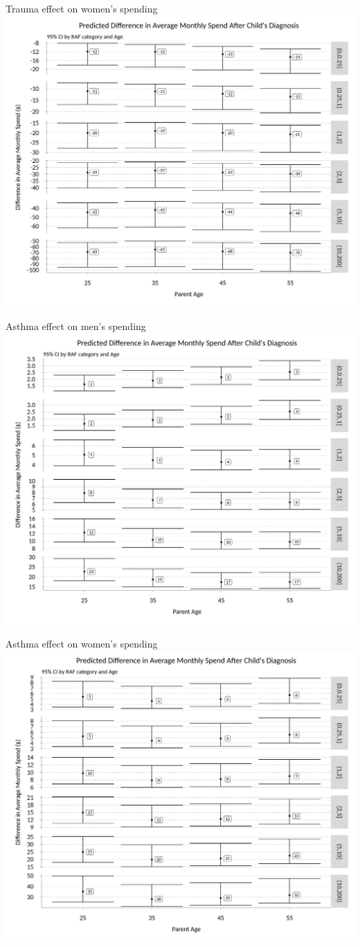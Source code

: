 \documentclass[xcolor=x11names,compress]{beamer}
\renewcommand{\(}{\begin{columns}}
\renewcommand{\)}{\end{columns}}
\newcommand{\<}[1]{\begin{column}{#1}}
\renewcommand{\>}{\end{column}}
\begin{document}
\begin{frame}{Trauma effect on women's spending}
\includegraphics[width=.75\linewidth]{../figures/predicted_spend_female_Trauma.png}
\end{frame}

\begin{frame}{Asthma effect on men's spending}
\includegraphics[width=.75\linewidth]{../figures/predicted_spend_male_Asthma.png}
\end{frame}

\begin{frame}{Asthma effect on women's spending}
\includegraphics[width=.75\linewidth]{../figures/predicted_spend_female_Asthma.png}
\end{frame}
\end{document}
